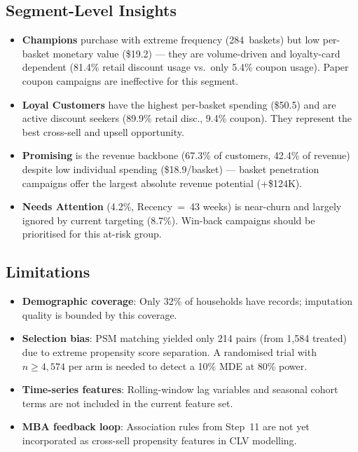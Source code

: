 \documentclass[conference]{IEEEtran}
\begin{document}
\subsection{Segment-Level Insights}

\begin{itemize}
  \item \textbf{Champions} purchase with extreme frequency
        (284~baskets) but low per-basket monetary value
        (\$19.2) --- they are volume-driven and loyalty-card
        dependent (81.4\% retail discount usage vs.\ only 5.4\%
        coupon usage). Paper coupon campaigns are ineffective for
        this segment.
  \item \textbf{Loyal Customers} have the highest per-basket spending
        (\$50.5) and are active discount seekers
        (89.9\% retail disc., 9.4\% coupon). They represent the
        best cross-sell and upsell opportunity.
  \item \textbf{Promising} is the revenue backbone (67.3\% of
        customers, 42.4\% of revenue) despite low individual
        spending (\$18.9/basket) --- basket penetration campaigns
        offer the largest absolute revenue potential (+\$124K).
  \item \textbf{Needs Attention} (4.2\%, Recency~=~43 weeks)
        is near-churn and largely ignored by current targeting
        (8.7\%). Win-back campaigns should be prioritised for
        this at-risk group.
\end{itemize}

\subsection{Limitations}

\begin{itemize}
  \item \textbf{Demographic coverage}: Only 32\% of households
        have records; imputation quality is bounded by this
        coverage.
  \item \textbf{Selection bias}: PSM matching yielded only
        214 pairs (from 1{,}584 treated) due to extreme
        propensity score separation. A randomised trial with
        $n \geq 4{,}574$ per arm is needed to detect a 10\%
        MDE at 80\% power.
  \item \textbf{Time-series features}: Rolling-window lag
        variables and seasonal cohort terms are not included
        in the current feature set.
  \item \textbf{MBA feedback loop}: Association rules from
        Step~11 are not yet incorporated as cross-sell
        propensity features in CLV modelling.
\end{itemize}
\end{document}
